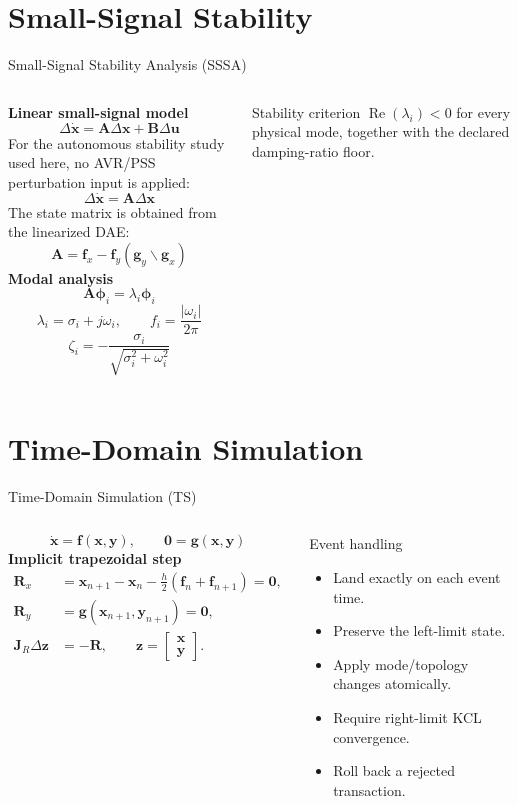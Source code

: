 ﻿\documentclass{beamer}
\begin{document}
\section{Small-Signal Stability}
\begin{frame}{Small-Signal Stability Analysis (SSSA)}
\begin{columns}[c,onlytextwidth]
\small
\textbf{Linear small-signal model}
\[
\Delta\dot{\bm x}=\bm A\Delta\bm x+\bm B\Delta\bm u
\]
For the autonomous stability study used here, no AVR/PSS perturbation input is applied:
\[
\boxed{\Delta\dot{\bm x}=\bm A\Delta\bm x}
\]
The state matrix is obtained from the linearized DAE:
\[
\boxed{\bm A=\bm f_x-\bm f_y\left(\bm g_y\backslash\bm g_x\right)}
\]
\small
\textbf{Modal analysis}
\[
\boxed{\bm A\bm\phi_i=\lambda_i\bm\phi_i}
\]
\[
\lambda_i=\sigma_i+j\omega_i,\qquad
f_i=\frac{|\omega_i|}{2\pi}
\]
\[
\zeta_i=-\frac{\sigma_i}{\sqrt{\sigma_i^2+\omega_i^2}}
\]
\begin{block}{Stability criterion}
$\operatorname{Re}(\lambda_i)<0$ for every physical mode, together with the declared damping-ratio floor.
\end{block}
\end{columns}
\end{frame}
\section{Time-Domain Simulation}
\begin{frame}{Time-Domain Simulation (TS)}
\begin{columns}[t,onlytextwidth]
\footnotesize
\[
\dot{\bm{x}}=\bm{f}(\bm{x},\bm{y}),\qquad
\bm{0}=\bm{g}(\bm{x},\bm{y})
\]
\textbf{Implicit trapezoidal step}
\begin{align*}
\bm{R}_x &= \bm{x}_{n+1}-\bm{x}_{n}
-\frac{h}{2}\left(\bm{f}_{n}+\bm{f}_{n+1}\right)=\bm{0},\\
\bm{R}_y &= \bm{g}(\bm{x}_{n+1},\bm{y}_{n+1})=\bm{0},\\
\bm{J}_R\Delta\bm{z} &= -\bm{R},\qquad
\bm{z}=\begin{bmatrix}\bm{x}\\\bm{y}\end{bmatrix}.
\end{align*}
\scriptsize
\begin{block}{Event handling}
\begin{itemize}
  \item Land exactly on each event time.
  \item Preserve the left-limit state.
  \item Apply mode/topology changes atomically.
  \item Require right-limit KCL convergence.
  \item Roll back a rejected transaction.
\end{itemize}
\end{block}
\end{columns}
\end{frame}
\end{document}
